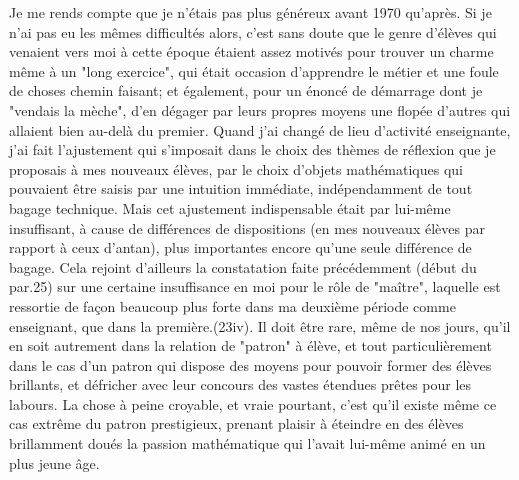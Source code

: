 {Je me rends compte que je n'étais pas plus généreux avant 1970 qu'après. Si je n'ai pas eu les mêmes difficultés alors, c'est sans doute que le genre d'élèves qui venaient vers moi à cette époque étaient assez motivés pour trouver un charme même à un "long exercice", qui était occasion d'apprendre le métier et une foule de choses chemin faisant; et également, pour un énoncé de démarrage dont je "vendais la mèche", d'en dégager par leurs propres moyens une flopée d'autres qui allaient bien au-delà du premier. Quand j'ai changé de lieu d'activité enseignante, j'ai fait l'ajustement qui s'imposait dans le choix des thèmes de réflexion que je proposais à mes nouveaux élèves, par le choix d'objets mathématiques qui pouvaient être saisis par une intuition immédiate, indépendamment de tout bagage technique. Mais cet ajustement indispensable était par lui-même insuffisant, à cause de différences de dispositions (en mes nouveaux élèves par rapport à ceux d'antan), plus importantes encore qu'une seule différence de bagage. Cela rejoint d'ailleurs la constatation faite précédemment (début du par.25) sur une certaine insuffisance en moi pour le rôle de "maître", laquelle est ressortie de façon beaucoup plus forte dans ma deuxième période comme enseignant, que dans la première.}(23iv). Il doit être rare, même de nos jours, qu'il en soit autrement dans la relation de "patron" à élève, et tout particulièrement dans le cas d'un patron qui dispose des moyens pour pouvoir former des élèves brillants, et défricher avec leur concours des vastes étendues prêtes pour les labours. La chose à peine croyable, et vraie pourtant, c'est qu'il existe même ce cas extrême du patron prestigieux, prenant plaisir à éteindre en des élèves brillamment doués la passion mathématique qui l'avait lui-même animé en un plus jeune âge.

